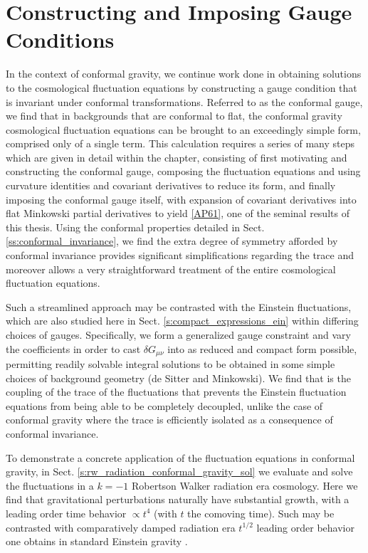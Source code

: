 
\chapter{Constructing and Imposing Gauge Conditions}
\label{c:constructing_gauge_conditions}
In the context of conformal gravity, we continue work done in obtaining solutions to the cosmological fluctuation equations \cite{mannheim_2012} by constructing a gauge condition that is invariant under conformal transformations. Referred to as the conformal gauge, we find that in backgrounds that are conformal to flat, the conformal gravity cosmological fluctuation equations can be brought to an exceedingly simple form, comprised only of a single term. This calculation requires a series of many steps which are given in detail within the chapter, consisting of first motivating and constructing the conformal gauge, composing the fluctuation equations and using curvature identities and covariant derivatives to reduce its form, and finally imposing the conformal gauge itself, with expansion of covariant derivatives into flat Minkowski partial derivatives to yield \eqref{AP61}, one of the seminal results of this thesis. Using the conformal properties detailed in Sect. \ref{ss:conformal_invariance}, we find the extra degree of symmetry afforded by conformal invariance provides significant simplifications regarding the trace and moreover allows a very straightforward treatment of the entire cosmological fluctuation equations.

Such a streamlined approach may be contrasted with the Einstein fluctuations, which are also studied here in Sect. \ref{s:compact_expressions_ein} within differing choices of gauges. Specifically, we form a generalized gauge constraint and vary the coefficients in order to cast $\delta G_{\mu\nu}$ into as reduced and compact form possible, permitting readily solvable integral solutions to be obtained in some simple choices of background geometry (de Sitter and Minkowski). We find that is the coupling of the trace of the fluctuations that prevents the Einstein fluctuation equations from being able to be completely decoupled, unlike the case of conformal gravity where the trace is efficiently isolated as a consequence of conformal invariance.

To demonstrate a concrete application of the fluctuation equations in conformal gravity, in Sect. \ref{s:rw_radiation_conformal_gravity_sol} we evaluate and solve the fluctuations in a $k=-1$ Robertson Walker radiation era cosmology. Here we find that gravitational perturbations naturally have substantial growth, with a leading order time behavior $\propto t^4$ (with $t$ the comoving time). Such may be contrasted with comparatively damped radiation era $t^{1/2}$ leading order behavior one obtains in standard Einstein gravity \cite{weinberg_2008}.

